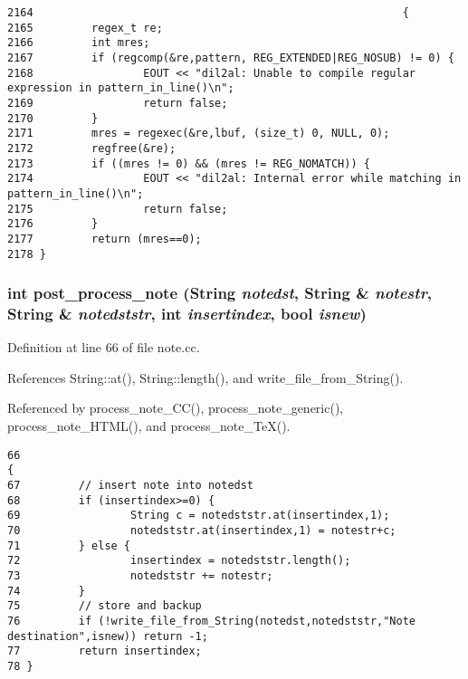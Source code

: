 \footnotesize\begin{verbatim}2164                                                         {
2165         regex_t re;
2166         int mres;
2167         if (regcomp(&re,pattern, REG_EXTENDED|REG_NOSUB) != 0) {
2168                 EOUT << "dil2al: Unable to compile regular expression in pattern_in_line()\n";
2169                 return false;
2170         }
2171         mres = regexec(&re,lbuf, (size_t) 0, NULL, 0);
2172         regfree(&re);
2173         if ((mres != 0) && (mres != REG_NOMATCH)) {
2174                 EOUT << "dil2al: Internal error while matching in pattern_in_line()\n";
2175                 return false;
2176         }
2177         return (mres==0);
2178 }
\end{verbatim}\normalsize 
{}
\subsubsection{\setlength{\rightskip}{0pt plus 5cm}int post\_\-process\_\-note ({\bf String} {\em notedst}, {\bf String} \& {\em notestr}, {\bf String} \& {\em notedststr}, int {\em insertindex}, bool {\em isnew})}\label{dil2al_8hh_a331}




Definition at line 66 of file note.cc.

References String::at(), String::length(), and write\_\-file\_\-from\_\-String().

Referenced by process\_\-note\_\-CC(), process\_\-note\_\-generic(), process\_\-note\_\-HTML(), and process\_\-note\_\-Te\-X().



\footnotesize\begin{verbatim}66                                                                                                           {
67         // insert note into notedst
68         if (insertindex>=0) {
69                 String c = notedststr.at(insertindex,1);
70                 notedststr.at(insertindex,1) = notestr+c;
71         } else {
72                 insertindex = notedststr.length();
73                 notedststr += notestr;
74         }
75         // store and backup
76         if (!write_file_from_String(notedst,notedststr,"Note destination",isnew)) return -1;
77         return insertindex;
78 }
\end{verbatim}\normalsize 
{}
